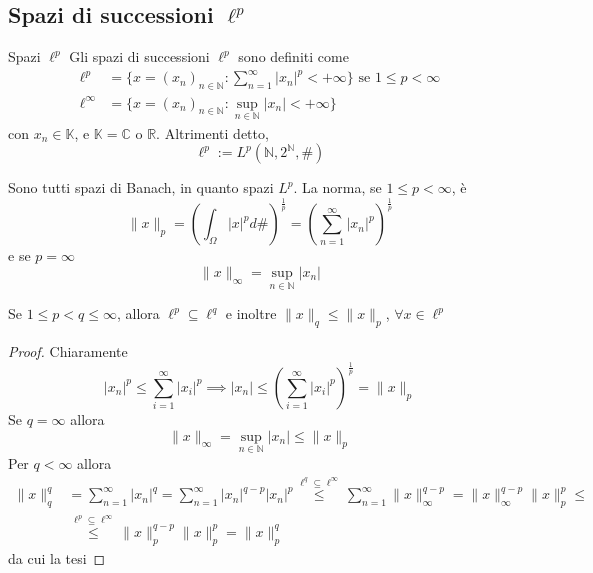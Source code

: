 \subsection{Spazi di successioni \(\ell^{p}\) }
\begin{definition}{Spazi \(\ell^{p}\)}
    Gli spazi di successioni \(\ell^{p}\) sono definiti come
    \begin{align*}
        \ell^{p} &= \{x = {(x_{n})}_{n \in \mathbb{N}} : \sum_{n=1}^{\infty}
        |x_{n}|^{p} < +\infty \} \text{ se } 1 \le p < \infty \\
            \ell^{\infty} &= \{x = {(x_{n})}_{n \in \mathbb{N}} : \sup_{n \in
        \mathbb{N}} |x_{n}| < +\infty\} 
    \end{align*}
    con \(x_{n} \in \mathbb{K}\), e \(\mathbb{K}= \mathbb{C}\) o \(\mathbb{R}\).
    Altrimenti detto, 
    \[
        \ell^{p} := L^{p}{\left( \mathbb{N}, 2^{\mathbb{N}}, \# \right)} 
    \]
\end{definition}
Sono tutti spazi di Banach, in quanto spazi \(L^{p}\). La norma, se \(1 \le p <
\infty\), è
\[
    \|x\|_p = {\left( \int_{\Omega} |x|^{p} d\#  \right)} ^{\frac{1}{p}} =
    {\left( \sum_{n=1}^{\infty} |x_{n}|^{p}  \right)} ^{\frac{1}{p}} 
\]
e se \(p = \infty\) 
\[
    \|x\|_{\infty} = \sup_{n \in \mathbb{N}} |x_{n}|
\]
\begin{proposition}
    Se \(1 \le p < q \le \infty\), allora \(\ell^{p} \subseteq \ell^{q}\) e
    inoltre \(\|x\|_q \le \|x\|_p\), \(\forall x \in \ell^{p}\) 
\end{proposition}
\begin{proof}
    Chiaramente
    \[
       |x_{n}|^{p} \le \sum_{i=1}^{\infty} |x_{i}|^{p} \implies |x_{n}| \le
       {\left( \sum_{i=1}^{\infty} |x_{i}|^{p}  \right)}^{\frac{1}{p}} = \|x\|_p
    \]
    Se \(q = \infty\) allora 
    \[
        \|x\|_{\infty} = \sup_{n \in \mathbb{N}} |x_{n}| \le \|x\|_p
    \]
    Per \(q < \infty\) allora
    \begin{align*}
        \|x\|_q^{q} &= \sum_{n=1}^{\infty} |x_{n}|^{q} = \sum_{n=1}^{\infty}
        |x_{n}|^{q-p}|x_{n}|^{p} \overset{\ell^{q} \subseteq \ell^{\infty} }{\le
        } \sum_{n=1}^{\infty} \|x\|_{\infty} ^{q-p} = \|x\|_{\infty} ^{q-p}
        \|x\|_p^{p} \le \\
        &\overset{\ell^{p} \subseteq\ell^{\infty} }{\le } \|x\|_{p} ^{q-p}
        \|x\|^{p}_p = \|x\|_p^{q} 
    \end{align*}
    da cui la tesi
\end{proof}


